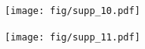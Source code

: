 \documentclass[sn-mathphys-num]{sn-jnl}%
\theoremstyle{thmstyleone}%
\theoremstyle{thmstyletwo}%
\theoremstyle{thmstylethree}%
\begin{document}
\begin{appendices}
\begin{figure}[!htb] 
	\centering
	\texttt{[image: fig/supp\_10.pdf]}
	\caption{
	} \label{fig:supp_10}
\end{figure}


\begin{figure}[!htb] 
	\centering
	\texttt{[image: fig/supp\_11.pdf]}
	\caption{
	} \label{fig:supp_11}
\end{figure}






\end{appendices}



%
\end{document}
